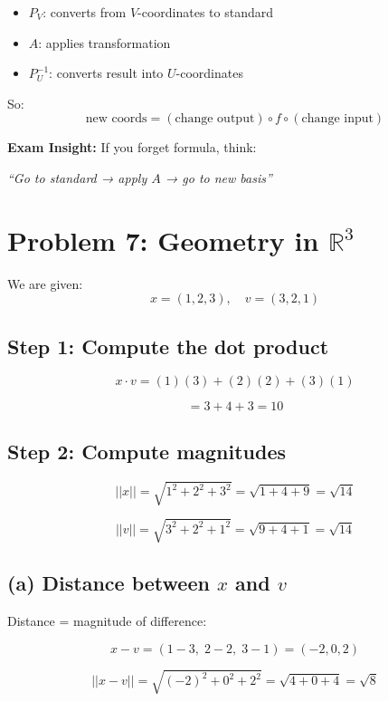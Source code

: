\documentclass[11pt]{article}
\begin{document}
\begin{itemize}
    \item $P_V$: converts from $V$-coordinates to standard
    \item $A$: applies transformation
    \item $P_U^{-1}$: converts result into $U$-coordinates
\end{itemize}

So:
\[
\text{new coords} = (\text{change output}) \circ f \circ (\text{change input})
\]

\textbf{Exam Insight:}
If you forget formula, think:
\begin{center}
\textit{“Go to standard → apply $A$ → go to new basis”}
\end{center}

\hrulefill

\section*{Problem 7: Geometry in $\mathbb{R}^3$}

We are given:
\[
x = (1,2,3), \quad v = (3,2,1)
\]

\subsection*{Step 1: Compute the dot product}

\[
x \cdot v = (1)(3) + (2)(2) + (3)(1)
\]

\[
= 3 + 4 + 3 = 10
\]

\hrulefill

\subsection*{Step 2: Compute magnitudes}

\[
||x|| = \sqrt{1^2 + 2^2 + 3^2}
= \sqrt{1 + 4 + 9}
= \sqrt{14}
\]

\[
||v|| = \sqrt{3^2 + 2^2 + 1^2}
= \sqrt{9 + 4 + 1}
= \sqrt{14}
\]

\hrulefill

\subsection*{(a) Distance between $x$ and $v$}

Distance = magnitude of difference:

\[
x - v = (1-3,\; 2-2,\; 3-1)
= (-2, 0, 2)
\]

\[
||x - v|| =
\sqrt{(-2)^2 + 0^2 + 2^2}
= \sqrt{4 + 0 + 4}
= \sqrt{8}
\]
\end{document}

